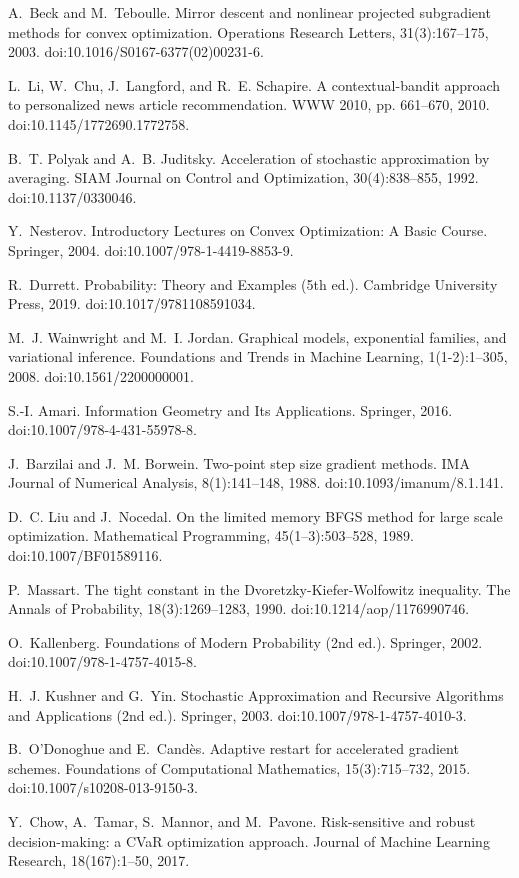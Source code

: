\begin{thebibliography}{99}
A.~Beck and M.~Teboulle.
Mirror descent and nonlinear projected subgradient methods for convex optimization.
Operations Research Letters, 31(3):167--175, 2003. doi:10.1016/S0167-6377(02)00231-6.

L.~Li, W.~Chu, J.~Langford, and R.~E. Schapire.
A contextual-bandit approach to personalized news article recommendation.
WWW 2010, pp. 661--670, 2010. doi:10.1145/1772690.1772758.

B.~T. Polyak and A.~B. Juditsky.
Acceleration of stochastic approximation by averaging.
SIAM Journal on Control and Optimization, 30(4):838--855, 1992. doi:10.1137/0330046.

Y.~Nesterov.
Introductory Lectures on Convex Optimization: A Basic Course.
Springer, 2004. doi:10.1007/978-1-4419-8853-9.

R.~Durrett.
Probability: Theory and Examples (5th ed.).
Cambridge University Press, 2019. doi:10.1017/9781108591034.

M.~J. Wainwright and M.~I. Jordan.
Graphical models, exponential families, and variational inference.
Foundations and Trends in Machine Learning, 1(1-2):1--305, 2008. doi:10.1561/2200000001.

S.-I. Amari.
Information Geometry and Its Applications.
Springer, 2016. doi:10.1007/978-4-431-55978-8.

J.~Barzilai and J.~M. Borwein.
Two-point step size gradient methods.
IMA Journal of Numerical Analysis, 8(1):141--148, 1988. doi:10.1093/imanum/8.1.141.

D.~C. Liu and J.~Nocedal.
On the limited memory BFGS method for large scale optimization.
Mathematical Programming, 45(1--3):503--528, 1989. doi:10.1007/BF01589116.

P.~Massart.
The tight constant in the Dvoretzky-Kiefer-Wolfowitz inequality.
The Annals of Probability, 18(3):1269--1283, 1990. doi:10.1214/aop/1176990746.

O.~Kallenberg.
Foundations of Modern Probability (2nd ed.).
Springer, 2002. doi:10.1007/978-1-4757-4015-8.

H.~J. Kushner and G.~Yin.
Stochastic Approximation and Recursive Algorithms and Applications (2nd ed.).
Springer, 2003. doi:10.1007/978-1-4757-4010-3.

B.~O'Donoghue and E.~Cand\`{e}s.
Adaptive restart for accelerated gradient schemes.
Foundations of Computational Mathematics, 15(3):715--732, 2015. doi:10.1007/s10208-013-9150-3.

Y.~Chow, A.~Tamar, S.~Mannor, and M.~Pavone.
Risk-sensitive and robust decision-making: a CVaR optimization approach.
Journal of Machine Learning Research, 18(167):1--50, 2017.

\end{thebibliography}
